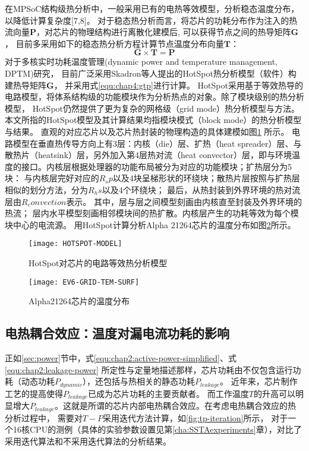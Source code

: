 在MPSoC结构级热分析中，一般采用已有的电热等效模型，分析稳态温度分布，以降低计算复杂度[7,8]。 对于稳态热分析而言，将芯片的功耗分布作为注入的热流向量$\mathbf{P}$，对芯片的物理结构进行离散化建模后, 可以获得节点之间的热导矩阵$\mathbf{G}$， 目前多采用如下的稳态热分析方程计算节点温度分布向量$\mathbf{T}$：
\begin{equation}
\label{equ:chap4:gtp}
\mathbf{G} \times \mathbf{T} = \mathbf{P}
\end{equation}
对于多核实时功耗温度管理(dynamic power and temperature management, DPTM)研究， 目前广泛采用Skadron等人提出的HotSpot热分析模型（软件）构建热导矩阵$\mathbf{G}$， 并采用式\ref{equ:chap4:gtp}进行计算。 HotSpot采用基于等效热导的电路模型，将体系结构级的功能模块作为分析热点的对象。除了模块级别的热分析模型， HotSpot仍然提供了更为复杂的网格级（grid mode）热分析模型与方法。本文所指的HotSpot模型及其计算结果均指模块模式（block mode）的热分析模型与结果。 直观的对应芯片以及芯片热封装的物理构造的具体建模如图\ref{fig:hotspot-model} 所示。
电路模型在垂直热传导方向上有3层：内核（die）层、扩热（heat spreader）层、与散热片（heatsink）层，另外加入第4层热对流（heat convector）层，即与环境温度的接口。内核层根据处理器的功能布局被分为对应的功能模块；扩热层分为5块： 与内核层完好对应的$R_sp$以及4块呈梯形状的环绕块；散热片层按照与扩热层相似的划分方法，分为$R_hs$以及4个环绕块； 最后，从热封装到外界环境的热对流层由$R_convection$表示。
其中，层与层之间模型刻画由内核直至封装及外界环境的热流； 层内水平模型刻画相邻模块间的热扩散。内核层产生的功耗等效为每个模块中心的电流源。 用HotSpot计算分析Alpha 21264芯片的温度分布如图\ref{fig:ev6-grid-temp-surf}所示。

\begin{figure}[H]
  \centering
  \texttt{[image: HOTSPOT-MODEL]}
  \caption{HotSpot对芯片的电路等效热分析模型}
  \label{fig:hotspot-model}
\end{figure}

\begin{figure}[H]
  \centering
  \texttt{[image: EV6-GRID-TEM-SURF]}
  \caption{Alpha21264芯片的温度分布}
  \label{fig:ev6-grid-temp-surf}
\end{figure}


\subsection{电热耦合效应：温度对漏电流功耗的影响}
正如\ref{sec:power}节中，式\ref{equ:chap2:active-power-simplified}、式\ref{equ:chap2:leakage-power} 所定性与定量地描述那样，芯片功耗由不仅包含运行功耗（动态功耗$P_{dynamic}$），还包括与热相关的静态功耗$P_{leakage}$。 近年来，芯片制作工艺的提高使得$P_{leakage}$已成为芯片功耗的主要贡献者。 而工作温度$T$的升高可以明显增大$P_{leakage}$。这就是所谓的芯片内部电热耦合效应。在考虑电热耦合效应的热分析过程中， 需要对$T-P$采用迭代方法计算，如\ref{fig:tp-iteration}所示， 对于一个16核CPU的测例（具体的实验参数设置见第\ref{cha:SSTAexperiments}章），对比了采用迭代算法和不采用迭代算法的分析结果。

